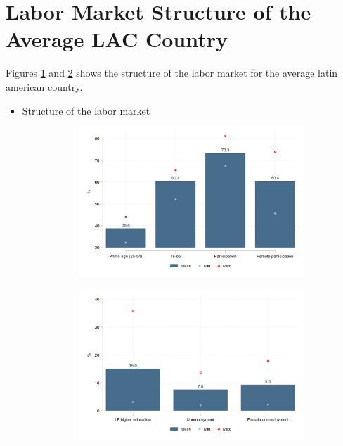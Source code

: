 \documentclass[english]{article}
\begin{document}
\section{Labor Market Structure of the Average LAC Country}
Figures \ref{fig:labmarket1} and \ref{fig:labmarket2} shows the structure of the labor market for the average latin american country. 
\begin{itemize}
    \item Structure of the labor market 

\begin{figure}[!htb]
\justifying
  \caption{Demographic profile and structure of labor market}
\begin{subfigure}{.9\textwidth}
  \justifying
  \includegraphics[width=1\linewidth]{latex/figures/Snapshot/Structure of labor market_a.png}
  \label{fig:labmarket1}
\end{subfigure}

\begin{subfigure}{.9\textwidth}
  \justifying
  \includegraphics[width=1\linewidth]{latex/figures/Snapshot/Structure of labor market_b.png}
  \label{fig:labmarket2}
\end{subfigure}
\label{fig:test}


\end{figure}
\end{itemize}
\end{document}
